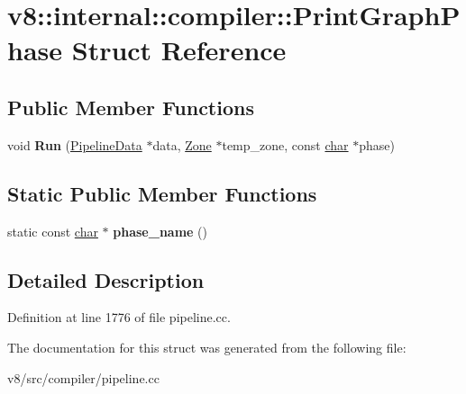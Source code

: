 \hypertarget{structv8_1_1internal_1_1compiler_1_1PrintGraphPhase}{}\section{v8\+:\+:internal\+:\+:compiler\+:\+:Print\+Graph\+Phase Struct Reference}
\label{structv8_1_1internal_1_1compiler_1_1PrintGraphPhase}
\subsection*{Public Member Functions}
\begin{DoxyCompactItemize}
\item 
\mbox{\label{structv8_1_1internal_1_1compiler_1_1PrintGraphPhase_a803d65cc7e2ba51215800a93c6a0046d}} 
void {\bfseries Run} (\mbox{\hyperlink{classv8_1_1internal_1_1compiler_1_1PipelineData}{Pipeline\+Data}} $\ast$data, \mbox{\hyperlink{classv8_1_1internal_1_1Zone}{Zone}} $\ast$temp\+\_\+zone, const \mbox{\hyperlink{classchar}{char}} $\ast$phase)
\end{DoxyCompactItemize}
\subsection*{Static Public Member Functions}
\begin{DoxyCompactItemize}
\item 
\mbox{\label{structv8_1_1internal_1_1compiler_1_1PrintGraphPhase_a398c629fda17ef06ad6d1d49c58ba70b}} 
static const \mbox{\hyperlink{classchar}{char}} $\ast$ {\bfseries phase\+\_\+name} ()
\end{DoxyCompactItemize}


\subsection{Detailed Description}


Definition at line 1776 of file pipeline.\+cc.



The documentation for this struct was generated from the following file\+:\begin{DoxyCompactItemize}
\item 
v8/src/compiler/pipeline.\+cc\end{DoxyCompactItemize}

